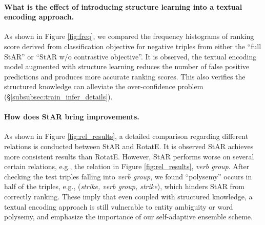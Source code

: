 \documentclass[sigconf]{acmart}
\begin{document}
\paragraph{What is the effect of introducing structure learning into a textual encoding approach.}

As shown in Figure \ref{fig:freq}, 
we compared the frequency histograms of ranking score  derived from classification objective for negative triples from either the ``full StAR'' or ``StAR w/o contrastive objective''. 
It is observed, the textual encoding model augmented with structure learning reduces the number of false positive predictions and produces more accurate ranking scores. This also verifies the structured knowledge can alleviate the over-confidence problem (\S\ref{subsubsec:train_infer_details}). 



\paragraph{How does StAR bring improvements.} 
As shown in Figure \ref{fig:rel_results}, a detailed comparison regarding different relations is conducted between StAR and RotatE. It is observed StAR achieves more consistent results than RotatE. 
However, StAR performs worse on several certain relations, e.g., the  relation in Figure \ref{fig:rel_results}, \textit{verb group}. After checking the test triples falling into \textit{verb group}, we found ``polysemy'' occurs in half of the triples, e.g., (\textit{strike, verb group, strike}), which hinders StAR from correctly ranking. 
These imply that even coupled with structured knowledge, a textual encoding approach is still vulnerable to entity ambiguity or word polysemy, and emphasize the importance of our self-adaptive ensemble scheme. 
\end{document}
